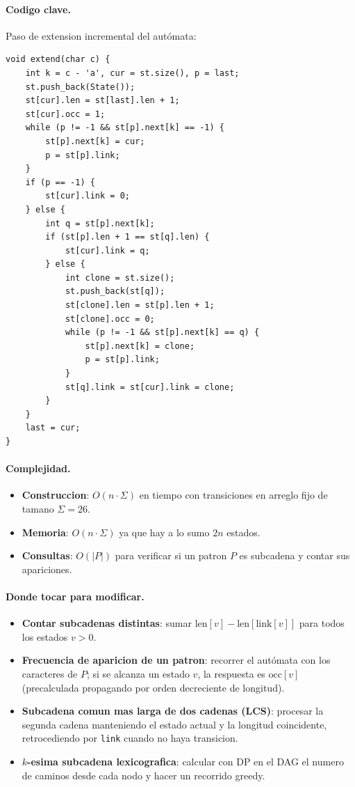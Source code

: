 \paragraph{Codigo clave.}
Paso de extension incremental del autómata:
\begin{verbatim}
void extend(char c) {
    int k = c - 'a', cur = st.size(), p = last;
    st.push_back(State());
    st[cur].len = st[last].len + 1;
    st[cur].occ = 1;
    while (p != -1 && st[p].next[k] == -1) {
        st[p].next[k] = cur;
        p = st[p].link;
    }
    if (p == -1) {
        st[cur].link = 0;
    } else {
        int q = st[p].next[k];
        if (st[p].len + 1 == st[q].len) {
            st[cur].link = q;
        } else {
            int clone = st.size();
            st.push_back(st[q]);
            st[clone].len = st[p].len + 1;
            st[clone].occ = 0;
            while (p != -1 && st[p].next[k] == q) {
                st[p].next[k] = clone;
                p = st[p].link;
            }
            st[q].link = st[cur].link = clone;
        }
    }
    last = cur;
}
\end{verbatim}

\paragraph{Complejidad.}
\begin{itemize}\setlength\itemsep{0pt}
	\item \textbf{Construccion}: $O(n \cdot \Sigma)$ en tiempo con transiciones en arreglo fijo de tamano $\Sigma = 26$.
	\item \textbf{Memoria}: $O(n \cdot \Sigma)$ ya que hay a lo sumo $2n$ estados.
	\item \textbf{Consultas}: $O(|P|)$ para verificar si un patron $P$ es subcadena y contar sus apariciones.
\end{itemize}

\paragraph{Donde tocar para modificar.}
\begin{itemize}\setlength\itemsep{0pt}
	\item \textbf{Contar subcadenas distintas}: sumar $\text{len}[v] - \text{len}[\text{link}[v]]$ para todos los estados $v > 0$.
	\item \textbf{Frecuencia de aparicion de un patron}: recorrer el autómata con los caracteres de $P$; si se alcanza un estado $v$, la respuesta es $\text{occ}[v]$ (precalculada propagando por orden decreciente de longitud).
	\item \textbf{Subcadena comun mas larga de dos cadenas (LCS)}: procesar la segunda cadena manteniendo el estado actual y la longitud coincidente, retrocediendo por \verb|link| cuando no haya transicion.
	\item \textbf{$k$-esima subcadena lexicografica}: calcular con DP en el DAG el numero de caminos desde cada nodo y hacer un recorrido greedy.
\end{itemize}

